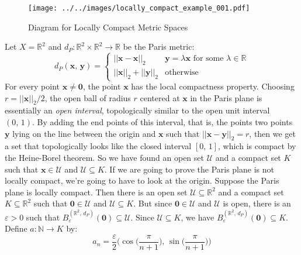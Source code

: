 \documentclass{article}
\theoremstyle{normal}
\begin{document}
    \begin{figure}[H]
        \centering
        \texttt{[image: ../../images/locally\_compact\_example\_001.pdf]}
        \caption{Diagram for Locally Compact Metric Spaces}
        \label{fig:locally_compact_metric_space_001}
    \end{figure}
    \color{black}
    Let $X=\mathbb{R}^{2}$ and
    $d_{P}:\mathbb{R}^{2}\times\mathbb{R}^{2}\rightarrow\mathbb{R}$
    be the Paris metric:
    \begin{equation}
        d_{P}(\mathbf{x},\,\mathbf{y})=
        \begin{cases}
            ||\mathbf{x}-\mathbf{x}||_{2}&\mathbf{y}=\lambda\mathbf{x}
                \textrm{ for some }\lambda\in\mathbb{R}\\
            ||\mathbf{x}||_{2}+||\mathbf{y}||_{2}&\textrm{otherwise}
        \end{cases}
    \end{equation}
    For every point $\mathbf{x}\ne\mathbf{0}$, the point $\mathbf{x}$ has the
    local compactness property. Choosing $r=||\mathbf{x}||_{2}/2$, the
    open ball of radius $r$ centered at $\mathbf{x}$ in the Paris plane is
    essentially an \textit{open interval}, topologically similar to the open
    unit interval $(0,\,1)$. By adding the end points of this interval,
    that is, the points two points $\mathbf{y}$ lying on the line between the
    origin and $\mathbf{x}$ such that $||\mathbf{x}-\mathbf{y}||_{2}=r$, then
    we get a set that topologically looks like the closed interval
    $[0,\,1]$, which is compact by the Heine-Borel theorem. So we have found
    an open set $\mathcal{U}$ and a compact set $K$ such that
    $\mathbf{x}\in\mathcal{U}$ and $\mathcal{U}\subseteq{K}$. If we are going
    to prove the Paris plane is not locally compact, we're going to have to
    look at the origin. Suppose the Paris plane is locally compact. Then there
    is an open set $\mathcal{U}\subseteq\mathbb{R}^{2}$ and a compact set
    $K\subseteq\mathbb{R}^{2}$ such that $\mathbf{0}\in\mathcal{U}$ and
    $\mathcal{U}\subseteq{K}$. But since $\mathbf{0}\in\mathcal{U}$ and
    $\mathcal{U}$ is open, there is an $\varepsilon>0$ such that
    $B_{\varepsilon}^{(\mathbb{R}^{2},\,d_{P})}(\mathbf{0})\subseteq\mathcal{U}$.
    Since $\mathcal{U}\subseteq{K}$, we have
    $B_{\varepsilon}^{(\mathbb{R}^{2},\,d_{P})}(\mathbf{0})\subseteq{K}$.
    Define $a:\mathbb{N}\rightarrow{K}$ by:
    \begin{equation}
        a_{n}=\frac{\varepsilon}{2}\Big(
            \cos\big(\frac{\pi}{n+1}\big),\,\sin\big(\frac{\pi}{n+1}\big)
        \Big)
    \end{equation}
\end{document}
